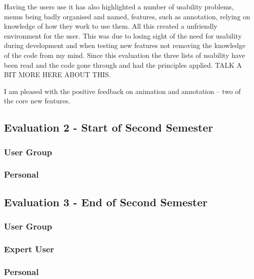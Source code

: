 Having the users use it has also highlighted a number of usability problems, menus being badly organised and named, features, such as annotation, relying on knowledge of how they work to use them.  All this created a unfriendly environment for the user.  This was due to losing sight of the need for usability during development and when testing new features not removing the knowledge of the code from my mind.  Since this evaluation the three lists of usability have been read and the code gone through and had the principles applied.  TALK A BIT MORE HERE ABOUT THIS.

I am pleased with the positive feedback on animation and annotation -- two of the core new features.

\subsection{Evaluation 2 - Start of Second Semester}
\subsubsection{User Group}
\subsubsection{Personal}

\subsection{Evaluation 3 - End of Second Semester}
\subsubsection{User Group}
\subsubsection{Expert User}
\subsubsection{Personal}
